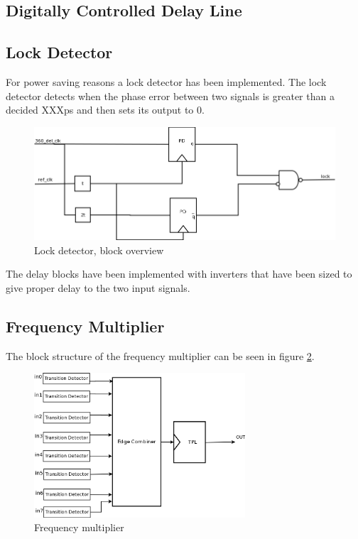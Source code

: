 \documentclass[a4paper,12pt]{article} \usepackage{graphicx}
\begin{document}
\subsection{Digitally Controlled Delay Line}
\subsection{Lock Detector}
For power saving reasons a lock detector has been implemented. The
lock detector detects when the phase error between two signals is
greater than a decided XXXps and then sets its output to 0.


\begin{figure}[h]
        \centering
        \includegraphics[width=150mm]{../Bilder/Lockdetector.png}
        \caption{Lock detector, block overview}
        \label{fig:LD_block}
\end{figure}

The delay blocks have been implemented with inverters that have been
sized to give proper delay to the two input signals.

\subsection{Frequency Multiplier}
The block structure of the frequency multiplier can be seen in figure 
\ref{fig:freq_mult}.
\begin{figure}[p]
        \centering
        \includegraphics[width=0.7\textwidth]{../Bilder/freq_mult_trans.png}
        \caption{Frequency multiplier}
        \label{fig:freq_mult}
\end{figure}
\end{document}
